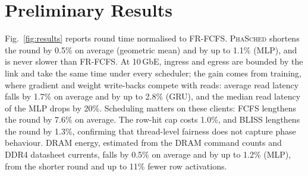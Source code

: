\documentclass[conference]{IEEEtran}
\newcommand{\name}{\textsc{PhaSched}}
\begin{document}
\section{Preliminary Results}
Fig.~\ref{fig:results} reports round time normalised to FR-FCFS. \name{} shortens the round by 0.5\% on average (geometric mean) and by up to 1.1\% (MLP), and is never slower than FR-FCFS. At 10\,GbE, ingress and egress are bounded by the link and take the same time under every scheduler; the gain comes from training, where gradient and weight write-backs compete with reads: average read latency falls by 1.7\% on average and by up to 2.8\% (GRU), and the median read latency of the MLP drops by 20\%. Scheduling matters on these clients: FCFS lengthens the round by 7.6\% on average. The row-hit cap costs 1.0\%, and BLISS lengthens the round by 1.3\%, confirming that thread-level fairness does not capture phase behaviour. DRAM energy, estimated from the DRAM command counts and DDR4 datasheet currents, falls by 0.5\% on average and by up to 1.2\% (MLP), from the shorter round and up to 11\% fewer row activations.
\end{document}
